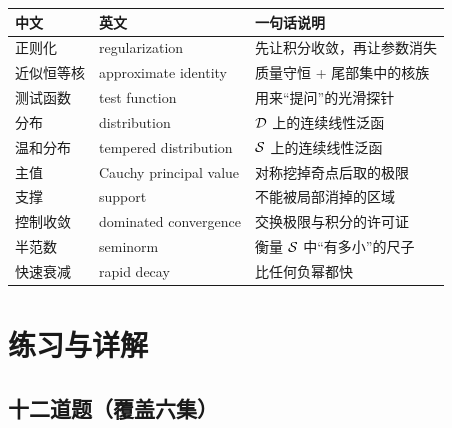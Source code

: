 \begin{center}
\small
\renewcommand{\arraystretch}{1.35}
\begin{tabularx}{\textwidth}{@{}L{3.6cm}L{4.6cm}Y@{}}
\toprule
中文 & 英文 & 一句话说明 \\
\midrule
正则化 & regularization & 先让积分收敛，再让参数消失 \\
近似恒等核 & approximate identity & 质量守恒 + 尾部集中的核族 \\
测试函数 & test function & 用来“提问”的光滑探针 \\
分布 & distribution & $\mathcal{D}$ 上的连续线性泛函 \\
温和分布 & tempered distribution & $\mathcal{S}$ 上的连续线性泛函 \\
主值 & Cauchy principal value & 对称挖掉奇点后取的极限 \\
支撑 & support & 不能被局部消掉的区域 \\
控制收敛 & dominated convergence & 交换极限与积分的许可证 \\
半范数 & seminorm & 衡量 $\mathcal{S}$ 中“有多小”的尺子 \\
快速衰减 & rapid decay & 比任何负幂都快 \\
\bottomrule
\end{tabularx}
\end{center}

\chapter{练习与详解}

\section{十二道题（覆盖六集）}

